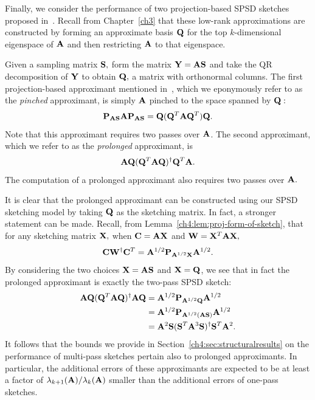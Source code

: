 Finally, we consider the performance of two projection-based SPSD sketches 
proposed in~\cite{HMT11}. Recall from Chapter~\ref{ch3} that these
low-rank approximations are constructed by forming an approximate basis $\mathbf{Q}$ for 
the top $k$-dimensional eigenspace of $\mathbf{A}$ and then restricting $\mathbf{A}$ to that eigenspace. 

Given a sampling matrix $\mathbf{S},$ form the matrix 
$\mathbf{Y} = \mathbf{A} \mathbf{S}$ and take the QR decomposition of $\mathbf{Y}$ to obtain 
$\mathbf{Q},$ a matrix with orthonormal columns. The first projection-based approximant
mentioned in~\cite{HMT11}, which we eponymously refer to as the \emph{pinched} approximant, is simply $\mathbf{A}$ pinched 
to the space spanned by $\mathbf{Q}:$ 
\[
 \mathbf{P}_{\mathbf{A} \mathbf{S}} \mathbf{A} \mathbf{P}_{\mathbf{A} \mathbf{S}} = \mathbf{Q} (\mathbf{Q}^T \mathbf{A} \mathbf{Q}^T) \mathbf{Q}.
\]
Note that this approximant requires two passes over $\mathbf{A}$. The second approximant, which 
we refer to as the \emph{prolonged} approximant, is 
\[
\mathbf{A} \mathbf{Q} (\mathbf{Q}^T \mathbf{A} \mathbf{Q})^\dagger \mathbf{Q}^T \mathbf{A}.
\]
The computation of a prolonged approximant also requires two passes over $\mathbf{A}.$

It is clear that the prolonged approximant can be constructed using our SPSD 
sketching model by taking $\mathbf{Q}$ as the sketching matrix. In fact, a stronger
statement can be made. Recall, from Lemma~\ref{ch4:lem:proj-form-of-sketch},
that for any sketching matrix $\mathbf{X},$ when 
$\mathbf{C} = \mathbf{A} \mathbf{X}$ and $\mathbf{W} = \mathbf{X}^T \mathbf{A} \mathbf{X},$
\[
 \mathbf{C} \mathbf{W}^\dagger \mathbf{C}^T = 
 \mathbf{A}^{1/2} \mathbf{P}_{\mathbf{A}^{1/2} \mathbf{X}} \mathbf{A}^{1/2}.
\]
By considering the two choices $\mathbf{X} = \mathbf{A} \mathbf{S}$ and $\mathbf{X} = \mathbf{Q}$, we 
see that in fact the prolonged approximant is exactly the two-pass SPSD sketch:
\begin{align*}
 \mathbf{A} \mathbf{Q} ( \mathbf{Q}^T \mathbf{A} \mathbf{Q})^\dagger \mathbf{A} \mathbf{Q} & = 
 \mathbf{A}^{1/2} \mathbf{P}_{\mathbf{A}^{1/2} \mathbf{Q}} \mathbf{A}^{1/2} \\
 & = \mathbf{A}^{1/2} \mathbf{P}_{\mathbf{A}^{1/2} (\mathbf{A} \mathbf{S}) } \mathbf{A}^{1/2} \\
 & = \mathbf{A}^2 \mathbf{S} (\mathbf{S}^T \mathbf{A}^3 \mathbf{S})^\dagger\mathbf{S}^T \mathbf{A}^2.
\end{align*}
It follows that the bounds we provide in Section~\ref{ch4:sec:structuralresults} on the 
performance of multi-pass sketches pertain also to 
prolonged approximants. In particular, the additional errors of these approximants
are expected to be at least a factor of $\lambda_{k+1}(\mathbf{A})/\lambda_k(\mathbf{A})$
smaller than the additional errors of one-pass sketches.


